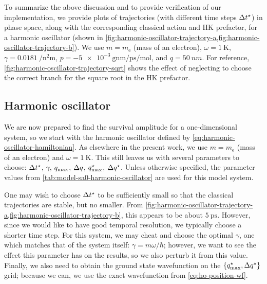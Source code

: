 To summarize the above discussion and to provide verification of our implementation, we provide plots of trajectories (with different time steps $\Delta t^\star$) in phase space, along with the corresponding classical action and HK prefactor, for a harmonic oscillator (shown in \cref{fig:harmonic-oscillator-trajectory-a,fig:harmonic-oscillator-trajectory-b}).
We use $m = m_\mathrm{e}$ (mass of an electron), $\omega = \SI{1}{\kelvin}$, $\gamma = \SI{0.0181}{\per\square\nano\meter}$, $p = \SI{-5e-3}{\gram\nano\meter\per\pico\second\per\mole}$, and $q = \SI{50}{nm}$.
For reference, \cref{fig:harmonic-oscillator-trajectory-sqrt} shows the effect of neglecting to choose the correct branch for the square root in the HK prefactor.


\subsection{Harmonic oscillator}

\label{sec:semiclassical-numerical-ho}

We are now prepared to find the survival amplitude for a one-dimensional system, so we start with the harmonic oscillator defined by \vref{eq:harmonic-oscillator-hamiltonian}.
As elsewhere in the present work, we use $m = m_\mathrm{e}$ (mass of an electron) and $\omega = \SI{1}{\kelvin}$.
This still leaves us with several parameters to choose: $\Delta t^\star$, $\gamma$, $q_\mathrm{max}$, $\Delta q$, $q_\mathrm{max}^\star$, $\Delta q^\star$.
Unless otherwise specified, the parameter values from \cref{tab:model-sa0-harmonic-oscillator} are used for this model system.

One may wish to choose $\Delta t^\star$ to be sufficiently small so that the classical trajectories are stable, but no smaller.
From \cref{fig:harmonic-oscillator-trajectory-a,fig:harmonic-oscillator-trajectory-b}, this appears to be about $\SI{5}{\pico\second}$.
However, since we would like to have good temporal resolution, we typically choose a shorter time step.
For this system, we may cheat and choose the optimal $\gamma$, one which matches that of the system itself: $\gamma = m \omega / \hbar$; however, we want to see the effect this parameter has on the results, so we also perturb it from this value.
Finally, we also need to obtain the ground state wavefunction on the $\{ q_\mathrm{max}^\star, \Delta q^\star \}$ grid; because we can, we use the exact wavefunction from \vref{eq:ho-position-wf}.

